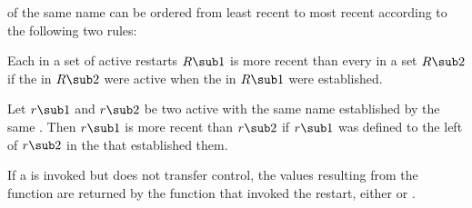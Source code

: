  of the same name can be ordered from least recent to
most recent according to the following two rules:
 
\beginlist
 
  Each  in a set of active restarts
$R\sub 1$ is more recent than every  in a
set $R\sub 2$ if the  
in $R\sub 2$ were active when the   in $R\sub 1$ were
established.
 
  Let $r\sub 1$ and $r\sub 2$ be two active  with
the same name established by the same . Then $r\sub 1$ is
more recent than $r\sub 2$ if $r\sub 1$ was defined to the
left of $r\sub 2$ in the  that established them.
 
\endlist

If a  is invoked but does not transfer control,
the values resulting from the  function are
returned by the function that invoked the restart, either
 or .


% 
% 
 
